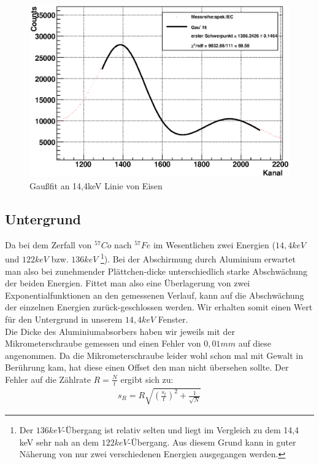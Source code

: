 \documentclass[12pt]{article}
\begin{document}
\begin{figure}[H]
 \includegraphics[width=0.9\linewidth]{pictures/eichung_spek.eps}
 \caption{Gaußfit an 14,4keV Linie von Eisen}
\label{spek}
\end{figure}

\subsection{Untergrund}
Da bei dem Zerfall von $^{57}Co$ nach $^{57}Fe$ im Wesentlichen zwei Energien ($14,4 keV$ und $122 keV$ bzw. $136 keV$
\footnote{Der $136 keV$-Übergang ist relativ selten und liegt im Vergleich zu dem 14,4 keV sehr nah an dem $122 keV$-Übergang. Aus diesem Grund kann in guter
Näherung von nur zwei verschiedenen Energien ausgegangen werden.}). Bei der Abschirmung durch Aluminium erwartet man also bei zunehmender Plättchen-dicke
unterschiedlich starke Abschwächung der beiden Energien. Fittet man also eine Überlagerung von zwei Exponentialfunktionen an den gemessenen Verlauf, kann auf
die Abschwächung der einzelnen Energien zurück-geschlossen werden. Wir erhalten somit einen Wert für den Untergrund in unserem $14,4 keV$ Fenster.\\

Die Dicke des Aluminiumabsorbers haben wir jeweils mit der Mikrometerschraube gemessen und einen Fehler von $0,01 mm$ auf diese angenommen. Da die Mikrometerschraube leider wohl schon mal mit Gewalt in Berührung kam, hat diese einen Offset den man nicht übersehen sollte.
Der Fehler auf die Zählrate $R = \frac{N}{t}$ ergibt sich zu:
\begin{align}
 s_R = R \sqrt{\left(\frac{s_t}{t}\right)^2 + \frac{1}{\sqrt{N}}}
\end{align}
\end{document}

